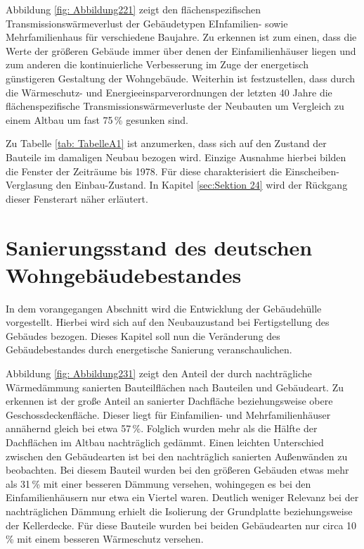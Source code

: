 Abbildung \ref{fig: Abbildung221} zeigt den flächenspezifischen Transmissionswärmeverlust der Gebäudetypen EInfamilien- sowie Mehrfamilienhaus für verschiedene Baujahre. 
Zu erkennen ist zum einen, dass die Werte der größeren Gebäude immer über denen der Einfamilienhäuser liegen und zum anderen die kontinuierliche Verbesserung im Zuge der energetisch günstigeren Gestaltung der Wohngebäude.
Weiterhin ist festzustellen, dass durch die Wärmeschutz- und Energieeinsparverordnungen der letzten 40 Jahre die flächenspezifische Transmissionswärmeverluste der Neubauten um Vergleich zu einem Altbau um fast 75\,\% gesunken sind.

Zu Tabelle \ref{tab: TabelleA1} ist anzumerken, dass sich auf den Zustand der Bauteile im damaligen Neubau bezogen wird. 
Einzige Ausnahme hierbei bilden die Fenster der Zeiträume bis 1978. 
Für diese charakterisiert die Einscheiben-Verglasung den Einbau-Zustand.
In Kapitel \ref{sec:Sektion 24} wird der Rückgang dieser Fensterart näher erläutert.

\section{Sanierungsstand des deutschen Wohngebäudebestandes}
\label{sec:Sektion 23}

In dem vorangegangen Abschnitt wird die Entwicklung der Gebäudehülle vorgestellt. 
Hierbei wird sich auf den Neubauzustand bei Fertigstellung des Gebäudes bezogen.
Dieses Kapitel soll nun die Veränderung des Gebäudebestandes durch energetische Sanierung veranschaulichen.

Abbildung \ref{fig: Abbildung231} zeigt den Anteil der durch nachträgliche Wärmedämmung sanierten Bauteilflächen nach Bauteilen und Gebäudeart.
Zu erkennen ist der große Anteil an sanierter Dachfläche beziehungsweise obere Geschossdeckenfläche.
Dieser liegt für Einfamilien- und Mehrfamilienhäuser annähernd gleich bei etwa 57\,\%.
Folglich wurden mehr als die Hälfte der Dachflächen im Altbau nachträglich gedämmt.
Einen leichten Unterschied zwischen den Gebäudearten ist bei den nachträglich sanierten Außenwänden zu beobachten. 
Bei diesem Bauteil wurden bei den größeren Gebäuden etwas mehr als 31\,\% mit einer besseren Dämmung versehen, wohingegen es bei den Einfamilienhäusern nur etwa ein Viertel waren.
Deutlich weniger Relevanz bei der nachträglichen Dämmung erhielt die Isolierung der Grundplatte beziehungsweise der Kellerdecke. 
Für diese Bauteile wurden bei beiden Gebäudearten nur circa 10\,\% mit einem besseren Wärmeschutz versehen. 

